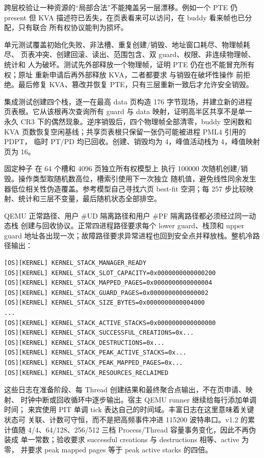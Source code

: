 跨层校验让一种资源的“局部合法”不能掩盖另一层漂移。例如一个 PTE 仍 present
但 KVA 描述符已丢失，在页表看来可以访问，在 buddy 看来帧也已分配，只有联合
所有权协议能判为损坏。

单元测试覆盖初始化失败、非法槽、重复创建/销毁、地址窗口耗尽、物理帧耗尽、
页表冲突、创建回滚、读出、范围包含、双 guard、权限、非连续物理帧、统计和
人为破坏。测试先外部释放一个物理帧，证明 PTE 仍在也不能冒充所有权；原址
重新申请后再外部释放 KVA，二者都要求  与销毁在破坏性操作
前拒绝。最后修复 KVA、篡改并恢复 PTE，只有三层重新一致后才允许安全销毁。

集成测试创建四个栈，逐一在最高 data 页构造 176 字节现场，并建立新的进程
页表根。它从该根再次查询所有 guard 与 data 映射，证明高半区共享不是单一
永久 CR3 下的偶然现象。逆序销毁后，四个物理帧全部清零，buddy 空闲数和
KVA 页数恢复空闲基线；共享页表根只保留一张仍可能被进程 PML4 引用的 PDPT，
临时 PT/PD 均已回收。创建、销毁均为 4，峰值活动栈为 4，峰值映射页为 16。

固定种子  在 64 个槽和 4096 页独立所有权模型上
执行 100000 次随机创建/销毁。操作类型取随机数高位，槽索引使用下一次独立
随机值，避免线性同余发生器低位相关性伪造覆盖。参考模型自己寻找六页
best-fit 空洞；每 257 步比较映射、统计和三层不变量，最后随机状态全部排空。

QEMU 正常路径、用户 \#UD 隔离路径和用户 \#PF 隔离路径都必须经过同一动态栈
创建与回收协议。正常四进程路径要求每个 lower guard、栈顶和 upper guard
地址各出现一次；故障路径要求异常进程也回到安全点并释放栈。整机冷路径输出：

\begin{verbatim}
[OS][KERNEL] KERNEL_STACK_MANAGER_READY
[OS][KERNEL] KERNEL_STACK_SLOT_CAPACITY=0x0000000000000200
[OS][KERNEL] KERNEL_STACK_MAPPED_PAGES=0x0000000000000004
[OS][KERNEL] KERNEL_STACK_GUARD_PAGES=0x0000000000000002
[OS][KERNEL] KERNEL_STACK_SIZE_BYTES=0x0000000000004000
...
[OS][KERNEL] KERNEL_STACK_ACTIVE_STACKS=0x0000000000000000
[OS][KERNEL] KERNEL_STACK_SUCCESSFUL_CREATIONS=0x...
[OS][KERNEL] KERNEL_STACK_DESTRUCTIONS=0x...
[OS][KERNEL] KERNEL_STACK_PEAK_ACTIVE_STACKS=0x...
[OS][KERNEL] KERNEL_STACK_PEAK_MAPPED_PAGES=0x...
[OS][KERNEL] KERNEL_STACK_RESOURCES_RECLAIMED
\end{verbatim}

这些日志在准备阶段、每 Thread 创建结果和最终聚合点输出，不在页申请、映射、
时钟中断或回收循环中逐步输出。宿主 QEMU runner 继续给每行添加单调时间；
来宾使用 PIT 单调 tick 表达自己的时间域。丰富日志在这里意味着关键状态可
关联、计数可守恒，而不是把高频事件冲进 115200 波特串口。v1.2 的累计值随
4/4、64/128、256/512 三档 Process/Thread 容量事务变化，因此不再伪装成
单一常数；验收要求 successful creations 与 destructions 相等、active 为零，
并要求 peak mapped pages 等于 peak active stacks 的四倍。

